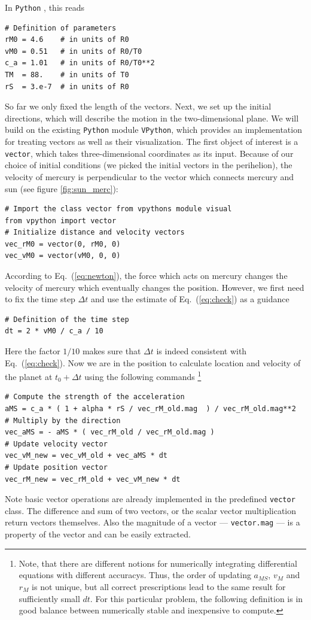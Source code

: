 \documentclass[12pt, UK english]{iopart}
\newcommand{\python}[0]{\texttt{Python} }
\begin{document}
In \python, this reads
\begin{lstlisting}
# Definition of parameters
rM0 = 4.6    # in units of R0
vM0 = 0.51   # in units of R0/T0
c_a = 1.01   # in units of R0/T0**2
TM  = 88.    # in units of T0
rS  = 3.e-7  # in units of R0
\end{lstlisting}
So far we only fixed the length of the vectors.
Next, we set up the initial directions, which will describe the motion in the two-dimensional plane.  We will build on the existing \python module \texttt{VPython}, which provides an implementation for treating vectors as well as their visualization.
The first object of interest is a \texttt{vector}, which takes three-dimensional coordinates as its input.
Because of our choice of initial conditions (we picked the initial vectors in the perihelion), the velocity of mercury is perpendicular to the vector which connects mercury and sun (see figure \ref{fig:sun_merc}):
\begin{lstlisting}
# Import the class vector from vpythons module visual
from vpython import vector
# Initialize distance and velocity vectors
vec_rM0 = vector(0, rM0, 0)
vec_vM0 = vector(vM0, 0, 0)
\end{lstlisting}
According to Eq.~(\ref{eq:newton}), the force which acts on mercury changes the velocity of mercury which eventually changes the position.
However, we first need to fix the time step $\Delta t$ and use the estimate of Eq.~(\ref{eq:check}) as a guidance
\begin{lstlisting}
# Definition of the time step
dt = 2 * vM0 / c_a / 10
\end{lstlisting}
Here the factor $1/10$ makes sure that $\Delta t$ is indeed consistent with Eq.~(\ref{eq:check}).
Now we are in the position to calculate location and velocity of the planet at $t_0+\Delta t$ using the following commands \footnote{%
	Note, that there are different notions for numerically integrating differential equations with different accuracys.
	Thus, the order of updating $a_{MS}$, $v_M$ and $r_M$ is not unique, but all correct prescriptions lead to the same result for sufficiently small $dt$.
	For this particular problem, the following definition is in good balance between numerically stable and inexpensive to compute.
}%
\begin{lstlisting}
# Compute the strength of the acceleration
aMS = c_a * ( 1 + alpha * rS / vec_rM_old.mag  ) / vec_rM_old.mag**2
# Multiply by the direction
vec_aMS = - aMS * ( vec_rM_old / vec_rM_old.mag )
# Update velocity vector
vec_vM_new = vec_vM_old + vec_aMS * dt
# Update position vector
vec_rM_new = vec_rM_old + vec_vM_new * dt
\end{lstlisting}
Note basic vector operations are already implemented in the predefined \texttt{vector} class.
The difference and sum of two vectors, or the scalar vector multiplication return vectors themselves.
Also the magnitude of a vector --- \texttt{vector.mag} --- is a property of the vector and can be easily extracted.
\end{document}
